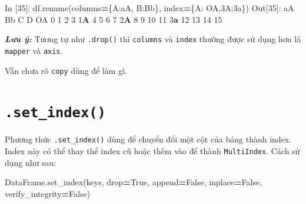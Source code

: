 \documentclass[
]{book}
\makeatletter
\newenvironment{Shaded}{\begin{snugshade}}{\end{snugshade}}
\newcommand{\DecValTok}[1]{\textcolor[rgb]{0.00,0.00,0.81}{#1}}
\newcommand{\ErrorTok}[1]{\textcolor[rgb]{0.64,0.00,0.00}{\textbf{#1}}}
\newcommand{\NormalTok}[1]{#1}
\newcommand{\OperatorTok}[1]{\textcolor[rgb]{0.81,0.36,0.00}{\textbf{#1}}}
\newcommand{\StringTok}[1]{\textcolor[rgb]{0.31,0.60,0.02}{#1}}
\newcommand{\VariableTok}[1]{\textcolor[rgb]{0.00,0.00,0.00}{#1}}
\newenvironment{kframe}{%
\medskip{}
\setlength{\fboxsep}{.8em}
 \def\at@end@of@kframe{}%
 \ifinner\ifhmode%
  \def\at@end@of@kframe{\end{minipage}}%
  \begin{minipage}{\columnwidth}%
 \fi\fi%
 \def\FrameCommand##1{\hskip\@totalleftmargin \hskip-\fboxsep
 \colorbox{shadecolor}{##1}\hskip-\fboxsep
     \hskip-\linewidth \hskip-\@totalleftmargin \hskip\columnwidth}%
 \MakeFramed {\advance\hsize-\width
   \@totalleftmargin\z@ \linewidth\hsize
   \@setminipage}}%
 {\par\unskip\endMakeFramed%
 \at@end@of@kframe}
\newenvironment{rmdblock}[1]
  {
  \begin{itemize}
  \renewcommand{\labelitemi}{
    \raisebox{-.7\height}[0pt][0pt]{
      {\setkeys{Gin}{width=3em,keepaspectratio}\texttt{[image: images/\#1]}}
    }
  }
  \setlength{\fboxsep}{1em}
  \begin{kframe}
  \item
  }
  {
  \end{kframe}
  \end{itemize}
  }
\newenvironment{rmdnote}
  {\begin{rmdblock}{note}}
  {\end{rmdblock}}
\makeatother
\begin{document}
\begin{Shaded}
\begin{Highlighting}[]
\NormalTok{In [}\DecValTok{35}\NormalTok{]: df.rename(columns}\OperatorTok{=}\NormalTok{\{}\StringTok{\textquotesingle{}A\textquotesingle{}}\NormalTok{:}\StringTok{\textquotesingle{}aA\textquotesingle{}}\NormalTok{, }\StringTok{\textquotesingle{}B\textquotesingle{}}\NormalTok{:}\StringTok{\textquotesingle{}Bb\textquotesingle{}}\NormalTok{\}, index}\OperatorTok{=}\NormalTok{\{}\StringTok{\textquotesingle{}A\textquotesingle{}}\NormalTok{: }\StringTok{\textquotesingle{}OA\textquotesingle{}}\NormalTok{,}\StringTok{\textquotesingle{}3A\textquotesingle{}}\NormalTok{:}\StringTok{\textquotesingle{}3a\textquotesingle{}}\NormalTok{\})}
\NormalTok{Out[}\DecValTok{35}\NormalTok{]:}
\NormalTok{    aA  Bb   C   D}
\NormalTok{OA   }\DecValTok{0}   \DecValTok{1}   \DecValTok{2}   \DecValTok{3}
\DecValTok{1}\ErrorTok{A}   \DecValTok{4}   \DecValTok{5}   \DecValTok{6}   \DecValTok{7}
\DecValTok{2}\ErrorTok{A}   \DecValTok{8}   \DecValTok{9}  \DecValTok{10}  \DecValTok{11}
\DecValTok{3}\ErrorTok{a}  \DecValTok{12}  \DecValTok{13}  \DecValTok{14}  \DecValTok{15}
\end{Highlighting}
\end{Shaded}

\begin{rmdnote}
\textbf{\emph{Lưu ý:}}
Tương tự như \texttt{.drop()} thì \texttt{columns} và \texttt{index} thường được sử dụng hơn là \texttt{mapper} và \texttt{axis}.

Vẫn chưa rõ \texttt{copy} dùng để làm gì.
\end{rmdnote}

\section{\texorpdfstring{\texttt{.set\_index()}}{.set\_index()}}\label{set_index}

Phương thức \texttt{.set\_index()} dùng để chuyển đổi một cột của bảng thành index. Index này có thể thay thể index cũ hoặc thêm vào để thành \texttt{MultiIndex}. Cách sử dụng như sau:

\begin{Shaded}
\begin{Highlighting}[]
\NormalTok{DataFrame.set\_index(keys, drop}\OperatorTok{=}\VariableTok{True}\NormalTok{, append}\OperatorTok{=}\VariableTok{False}\NormalTok{, inplace}\OperatorTok{=}\VariableTok{False}\NormalTok{, verify\_integrity}\OperatorTok{=}\VariableTok{False}\NormalTok{)}
\end{Highlighting}
\end{Shaded}
\end{document}
